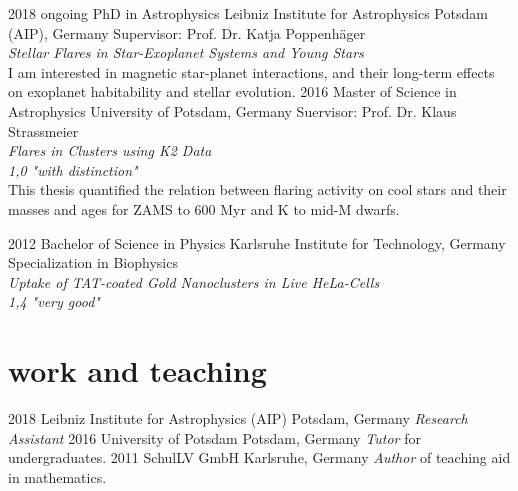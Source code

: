 \documentclass[]{k-cv} %
\begin{document}
\begin{entrylist}
\entry
{2018 \to ongoing}
{PhD {\normalfont in Astrophysics}}
{Leibniz Institute for Astrophysics Potsdam (AIP), Germany}
{Supervisor: Prof. Dr. Katja Poppenh\"ager\\
\emph{Stellar Flares in Star-Exoplanet Systems and Young Stars} \vspace{0.2cm}\\ I am interested in magnetic star-planet interactions, and their long-term effects on exoplanet habitability and stellar evolution.}
\entry
{2016 }
{Master {\normalfont of Science in Astrophysics}}
{University of Potsdam, Germany}
{Suervisor: Prof. Dr. Klaus Strassmeier\\
\emph{Flares in Clusters using K2 Data} \\ 
\emph{1,0 "with distinction"}\vspace{0.2cm}\\
This thesis quantified the relation between flaring activity on cool stars and their masses and ages for ZAMS to 600 Myr and K to mid-M dwarfs.}


\entry
{2012 }
{Bachelor {\normalfont of Science in Physics}}
{Karlsruhe Institute for Technology, Germany}
{Specialization in Biophysics\\
\emph{Uptake of TAT-coated Gold Nanoclusters in Live HeLa-Cells}\\
\emph{1,4 "very good"}}
\end{entrylist}

\section{work and teaching}

\begin{entrylist}

\entry
{2018}
{Leibniz Institute for Astrophysics (AIP)}
{Potsdam, Germany}
{\emph{Research Assistant}}
\entry
{2016 }
{University of Potsdam}
{Potsdam, Germany}
{\emph{Tutor} for undergraduates.}
\entry
{2011 }
{SchulLV GmbH}
{Karlsruhe, Germany}
{\emph{Author} of teaching aid in mathematics.}
\end{entrylist}
\end{document}
